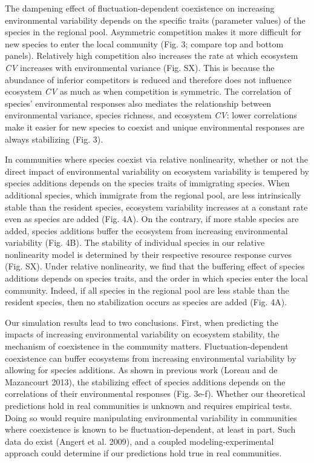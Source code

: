 \documentclass[12pt,]{article}
\begin{document}
The dampening effect of fluctuation-dependent coexistence on increasing
environmental variability depends on the specific traits (parameter
values) of the species in the regional pool. Asymmetric competition
makes it more difficult for new species to enter the local community
(Fig. 3; compare top and bottom panels). Relatively high competition
also increases the rate at which ecosystem \emph{CV} increases with
environmental variance (Fig. SX). This is because the abundance of
inferior competitors is reduced and therefore does not influence
ecosystem \emph{CV} as much as when competition is symmetric. The
correlation of species' environmental responses also mediates the
relationship between environmental variance, species richness, and
ecosystem \emph{CV}: lower correlations make it easier for new species
to coexist and unique environmental responses are always stabilizing
(Fig. 3).

In communities where species coexist via relative nonlinearity, whether
or not the direct impact of environmental variability on ecosystem
variability is tempered by species additions depends on the species
traits of immigrating species. When additional species, which immigrate
from the regional pool, are less intrinsically stable than the resident
species, ecosystem variability increases at a constant rate even as
species are added (Fig. 4A). On the contrary, if more stable species are
added, species additions buffer the ecosystem from increasing
environmental variability (Fig. 4B). The stability of individual species
in our relative nonlinearity model is determined by their respective
resource response curves (Fig. SX). Under relative nonlinearity, we find
that the buffering effect of species additions depends on species
traits, and the order in which species enter the local community.
Indeed, if all species in the regional pool are less stable than the
resident species, then no stabilization occurs as species are added
(Fig. 4A).

Our simulation results lead to two conclusions. First, when predicting
the impacts of increasing environmental variability on ecosystem
stability, the mechanism of coexistence in the community matters.
Fluctuation-dependent coexistence can buffer ecosystems from increasing
environmental variability by allowing for species additions. As shown in
previous work (Loreau and {{de Mazancourt}} 2013), the stabilizing
effect of species additions depends on the correlations of their
environmental responses (Fig. 3e-f). Whether our theoretical predictions
hold in real communities is unknown and requires empirical tests. Doing
so would require manipulating environmental variability in communities
where coexistence is known to be fluctuation-dependent, at least in
part. Such data do exist (Angert et al. 2009), and a coupled
modeling-experimental approach could determine if our predictions hold
true in real communities.
\end{document}
